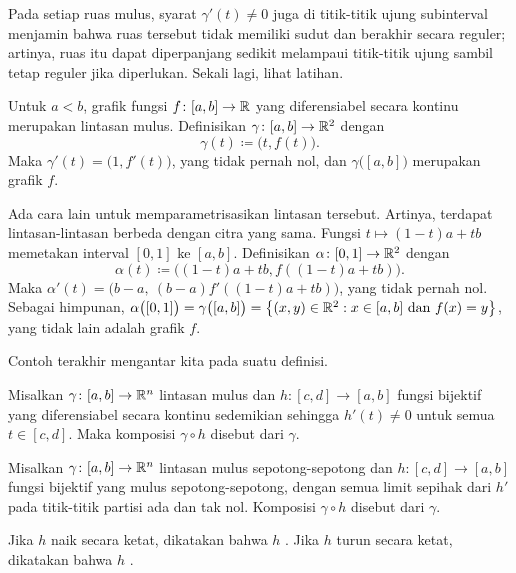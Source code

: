 Pada setiap ruas mulus, syarat $\gamma'(t) \neq 0$ juga di titik-titik ujung
subinterval menjamin bahwa ruas tersebut tidak memiliki sudut dan berakhir secara
reguler; artinya, ruas itu dapat diperpanjang sedikit melampaui titik-titik ujung
sambil tetap reguler jika diperlukan.  Sekali lagi, lihat latihan.

\begin{example}
Untuk $a<b$, grafik fungsi $f \colon [a,b] \to {\mathbb{R}}$ yang diferensiabel secara kontinu
merupakan lintasan mulus.  Definisikan $\gamma \colon [a,b] \to {\mathbb{R}}^2$ dengan
\begin{equation*}
\gamma(t) \coloneqq \bigl(t,f(t)\bigr) .
\end{equation*}
Maka $\gamma'(t) = \bigl( 1 , f'(t) \bigr)$, yang tidak pernah nol,
dan $\gamma\bigl([a,b]\bigr)$ merupakan grafik $f$.

Ada cara lain untuk memparametrisasikan lintasan tersebut.  Artinya, terdapat
lintasan-lintasan berbeda dengan citra yang sama.
Fungsi $t \mapsto (1-t)a+tb$ memetakan interval $[0,1]$ ke $[a,b]$.
Definisikan
$\alpha \colon [0,1] \to {\mathbb{R}}^2$ dengan
\begin{equation*}
\alpha(t) \coloneqq \bigl((1-t)a+tb,f((1-t)a+tb)\bigr) .
\end{equation*}
Maka
$\alpha'(t) = \bigl( b-a ,~ (b-a)f'((1-t)a+tb) \bigr)$, yang tidak pernah nol.
Sebagai himpunan, $\alpha\bigl([0,1]\bigr) = \gamma\bigl([a,b]\bigr)
= \bigl\{ (x,y) \in {\mathbb{R}}^2 : x \in [a,b] \text{ dan } f(x) = y \bigr\}$,
yang tidak lain adalah grafik $f$.
\end{example}

Contoh terakhir mengantar kita pada suatu definisi.

\begin{defn}
Misalkan $\gamma \colon [a,b] \to {\mathbb{R}}^n$ lintasan mulus dan
$h \colon [c,d] \to [a,b]$ fungsi bijektif yang diferensiabel secara kontinu
sedemikian sehingga $h'(t) \neq 0$ untuk semua $t \in [c,d]$.  Maka
komposisi
$\gamma \circ h$ disebut
\emph{}
dari $\gamma$.

Misalkan $\gamma \colon [a,b] \to {\mathbb{R}}^n$ lintasan mulus sepotong-sepotong dan
$h \colon [c,d] \to [a,b]$ fungsi bijektif yang mulus sepotong-sepotong,
dengan semua limit sepihak dari $h'$ pada titik-titik partisi ada dan tak nol.
Komposisi
$\gamma \circ h$ disebut
\emph{} dari $\gamma$.

Jika $h$ naik secara ketat, dikatakan bahwa $h$ 
\emph{}.  Jika $h$ turun secara ketat, dikatakan bahwa
$h$ \emph{}.
\end{defn}

